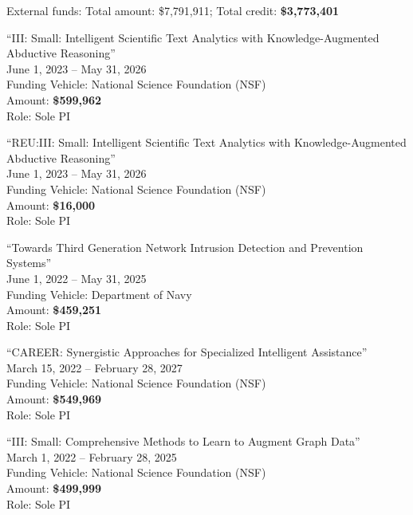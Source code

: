 \documentclass[10pt]{article}
\newenvironment{myindentpar}[1]%
{\begin{list}{}%
         {\setlength{\leftmargin}{#1}}%
         \item[]%
}
{\end{list}}
\newcounter{list}
\begin{document}
\begin{myindentpar}{0.75cm}

\hspace{-0.75cm}External funds: Total amount: \$7,791,911; Total credit: \textbf{\$3,773,401}

\hspace{-0.75cm}``III: Small: Intelligent Scientific Text Analytics with Knowledge-Augmented Abductive Reasoning'' \\
June 1, 2023 -- May 31, 2026 \\
Funding Vehicle: National Science Foundation (NSF) \\
Amount: \textbf{\$599,962} \\
Role: {Sole PI}

\hspace{-0.75cm}``REU:III: Small: Intelligent Scientific Text Analytics with Knowledge-Augmented Abductive Reasoning'' \\
June 1, 2023 -- May 31, 2026 \\
Funding Vehicle: National Science Foundation (NSF) \\
Amount: \textbf{\$16,000} \\
Role: {Sole PI}

\hspace{-0.75cm}``Towards Third Generation Network Intrusion Detection and Prevention Systems'' \\
June 1, 2022 -- May 31, 2025 \\
Funding Vehicle: Department of Navy \\
Amount: \textbf{\$459,251} \\
Role: {Sole PI}

\hspace{-0.75cm}``CAREER: Synergistic Approaches for Specialized Intelligent Assistance'' \\
March 15, 2022 -- February 28, 2027 \\
Funding Vehicle: National Science Foundation (NSF) \\
Amount: \textbf{\$549,969} \\
Role: {Sole PI}

\hspace{-0.75cm}``III: Small: Comprehensive Methods to Learn to Augment Graph Data'' \\
March 1, 2022 -- February 28, 2025 \\
Funding Vehicle: National Science Foundation (NSF) \\
Amount: \textbf{\$499,999} \\
Role: {Sole PI}


\end{myindentpar}
\end{document}
